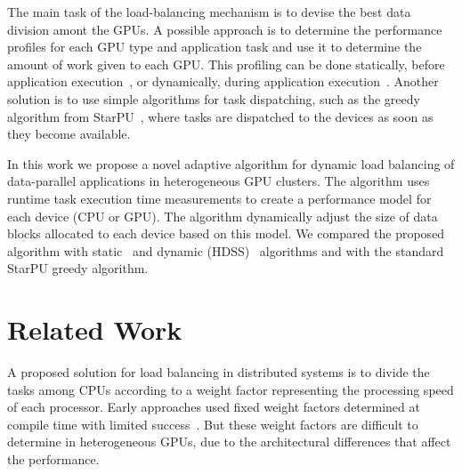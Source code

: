 \documentclass[journal]{IEEEtran}
\begin{document}
The main task of the load-balancing mechanism is to devise the best data
division amont the GPUs. A possible approach is to determine the performance
profiles for each GPU type and application task and use it to determine the
amount of work given to each GPU. This profiling can be done statically, before
application execution~\cite{raphael}, or dynamically, during application
execution~\cite{acosta, HDSS}. Another solution is to use simple algorithms for
task dispatching, such as the greedy algorithm from StarPU~\cite{starpu}, where
tasks are dispatched to the devices as soon as they become available.

In this work we propose a novel adaptive algorithm for dynamic load balancing of
data-parallel applications in heterogeneous GPU clusters. The algorithm uses
runtime task execution time measurements to create a performance model for each
device (CPU or GPU). The algorithm dynamically adjust the size of data blocks
allocated to each device based on this model. We compared the proposed algorithm
with static~\cite{raphael} and dynamic (HDSS)~\cite{HDSS} algorithms and with
the standard StarPU greedy algorithm.

% 
% 
% 
% 


\section{Related Work}

A proposed solution for load balancing in distributed systems is to divide the
tasks among CPUs according to a weight factor representing the processing speed
of each processor. Early approaches used fixed weight factors determined at
compile time with limited success~\cite{Hummel}. But these weight factors are
difficult to determine in heterogeneous GPUs, due to the architectural
differences that affect the performance.
\end{document}
